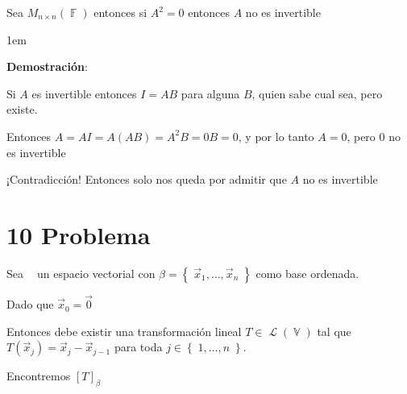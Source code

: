 \documentclass[12pt, fleqn]{article}                             %
\newenvironment{SmallIndentation}[1][0.75em]                    %
        {\begin{adjustwidth}{#1}{}\begin{footnotesize}}             %
        {\end{footnotesize}\end{adjustwidth}}                       %
\theoremstyle{break}                                            %
\DeclareMathOperator \GenericField {\mathbb{F}}                 %
\DeclareMathOperator \VectorSet    {\mathbb{V}}                 %
\DeclareMathOperator \VectorSpace  {\VectorSet_{\GenericField}} %
\DeclareMathOperator \LinTrans {\mathcal{T}}                    %
\DeclareMathOperator \Laplace {\mathcal{L}}                     %
\newcommand{\Set}[1]    {\left\{ \; #1 \; \right\}}             %
\begin{document}
    Sea $M_{n \times n}(\GenericField)$ entonces si $A^2 = 0$ entonces $A$ no es invertible

        \begin{SmallIndentation}[1em]
            \textbf{Demostración}:

            Si $A$ es invertible entonces $I = AB$ para alguna $B$, quien sabe cual sea, pero existe.

            Entonces $A = AI = A(AB) = A^2B = 0B = 0$, y por lo tanto $A = 0$, pero $0$ no es invertible

            ¡Contradicción! Entonces solo nos queda por admitir que $A$ no es invertible
        
        \end{SmallIndentation}



\clearpage
\section{10 Problema}

    Sea $\VectorSpace$ un espacio vectorial con $\beta = \Set{\vec x_1, \dots , \vec x_n}$ 
    como base ordenada.

    Dado que $\vec x_0 = \vec 0$

    Entonces debe existir una transformación lineal $T \in \Laplace(\VectorSet)$ tal
    que $T(\vec x_j) = \vec x_j - \vec x_{j - 1}$ para toda $j \in \Set{1, \dots, n}$.

    Encontremos $[T]_\beta$
\end{document}
